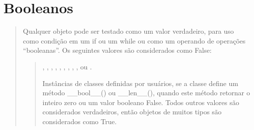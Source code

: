 \documentclass[letterpaper,10pt,brazil]{sphinxmanual}
\begin{document}
\begin{sphinxVerbatim}[commandchars=\\\{\}]
\end{sphinxVerbatim}


\chapter{Booleanos}
\label{\detokenize{content/boolean:booleanos}}\label{\detokenize{content/boolean::doc}}\begin{quote}

Qualquer objeto pode ser testado como um valor verdadeiro, para uso como condição em um if ou um while ou como um operando de operações “booleanas”. Os seguintes valores são considerados como False:
\begin{quote}

, , , , \sphinxcode{\sphinxupquote{{[}{]}}}, \sphinxcode{\sphinxupquote{()}}, \sphinxcode{\sphinxupquote{\{\}}}, , ,  ou \sphinxcode{\sphinxupquote{\textquotesingle{}\textquotesingle{}}}.

Instâncias de classes definidas por usuários, se a classe define um método \_\_bool\_\_() ou \_\_len\_\_(), quando este método retornar o inteiro zero ou um valor booleano False.
Todos outros valores são considerados verdadeiros, então objetos de muitos tipos são considerados como True.
\end{quote}
\end{quote}

\begin{sphinxVerbatim}[commandchars=\\\{\}]
  

\end{sphinxVerbatim}

\begin{sphinxVerbatim}[commandchars=\\\{\}]
\end{sphinxVerbatim}

\begin{sphinxVerbatim}[commandchars=\\\{\}]
  

\end{sphinxVerbatim}
\end{document}
